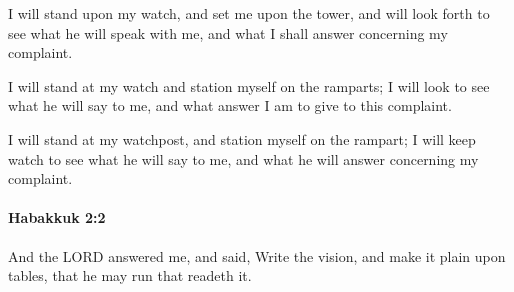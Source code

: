 			\begin{versebox}
					\item[BHS] 
					\item[LXX] 
					\item[ASV] I will stand upon my watch, and set me upon the tower, and will look forth to see what he will speak with me, and what I shall answer concerning my complaint.
					\item[NIV] I will stand at my watch and station myself on the ramparts; I will look to see what he will say to me, and what answer I am to give to this complaint.
					\item[NRSV] I will stand at my watchpost, and station myself on the rampart; I will keep watch to see what he will say to me, and what he will answer concerning my complaint.
			\end{versebox}

		\paragraph{Habakkuk 2:2} %
			\label{HABAKKUK-2-2}

			And the LORD answered me, and said, Write the vision, and make it plain upon tables, that he may run that readeth it.

